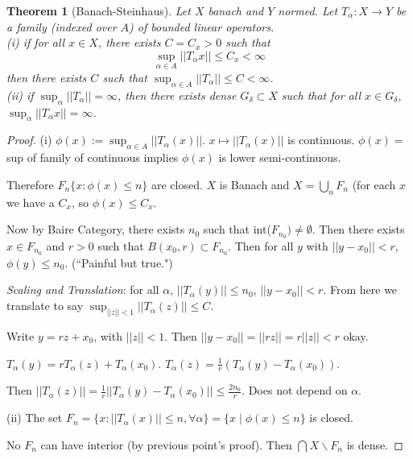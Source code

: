 \documentclass[11pt]{article}
\newtheorem{thm}{Theorem}[section]
\newcommand{\ra}{\rightarrow}
\newcommand{\sbs}{\subset}
\newcommand{\bs}{\backslash}
\newcommand{\es}{\emptyset}
\newcommand{\al}{\alpha}
\newcommand{\de}{\delta}
\newcommand{\bca}[2]{\bigcap_{#1}^{#2}}
\newcommand{\bcu}[2]{\bigcup_{#1}^{#2}}
\newcommand{\fr}[2]{\frac{#1}{#2}}
\begin{document}
\begin{thm}[Banach-Steinhaus]
Let $X$ banach and $Y$ normed. Let $T_{\al}: X\ra Y$ be a family (indexed over $A$) of bounded linear operators. \\
(i) if for all $x\in X$, there exists $C=C_x>0$ such that \[\sup_{\al\in A}||T_{\al}x||\le C_x<\infty\] then there exists $C$ such that $\sup_{\al\in A}||T_{\al}||\le C<\infty$. \\
(ii) if $\sup_{\al}||T_{\al}||=\infty$, then there exists dense $G_{\de}\sbs X$ such that for all $x\in G_{\de}$, $\sup_{\al}||T_{\al}x||=\infty$. 
\end{thm}
\begin{proof}
(i) $\phi(x):=\sup_{\al\in A}||T_{\al}(x)||$. $x\mapsto ||T_{\al}(x)||$ is continuous. $\phi(x)=$ sup of family of continuous implies $\phi(x)$ is lower semi-continuous. 

Therefore $F_n\{x: \phi(x)\le n\}$ are closed. $X$ is Banach and $X=\bcu{n}{}F_n$ (for each $x$ we have a $C_x$, so $\phi(x)\le C_x$. 

Now by Baire Category, there exists $n_0$ such that int($F_{n_0})\neq\es$. Then there exists $x\in F_{n_0}$ and $r>0$ such that $B(x_0,r)\sbs F_{n_0}$. Then for all $y$ with $||y-x_0||<r$, $\phi(y)\le n_0$. (``Painful but true.") 

{\it Scaling and Translation}: for all $\al$, $||T_{\al}(y)||\le n_0$, $||y-x_0||<r$. From here we translate to say $\sup_{||z||<1}||T_{\al}(z)||\le C$. 

Write $y=rz+x_0$, with $||z||<1$. Then $||y-x_0||=||rz||=r||z||<r$ okay. 

$T_{\al}(y)=rT_{\al}(z)+T_{\al}(x_0)$. $T_{\al}(z)=\fr{1}{r}(T_{\al}(y)-T_{\al}(x_0))$. 

Then $||T_{\al}(z)||=\fr{1}{r}||T_{\al}(y)-T_{\al}(x_0)||\le \fr{2n_0}{r}$. Does not depend on $\al$. 

(ii) The set $F_n=\{x:||T_{\al}(x)||\le n,\forall\al\}=\{x\mid \phi(x)\le n\}$ is closed. 

No $F_n$ can have interior (by previous point's proof). Then $\bca{}{}X\bs F_n$ is dense. 

\end{proof}
\end{document}
